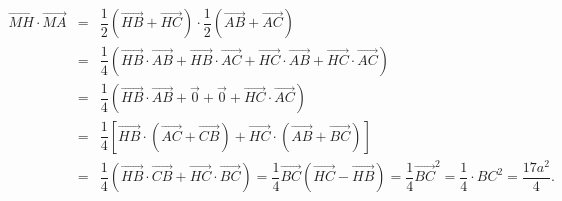 \begin{bt}
{{\begin{tikzpicture}[>=stealth,line join=round,line cap=round,line width=0.6pt,font=\footnotesize,scale=1]
     \end{tikzpicture}
 }
 \begin{eqnarray*}
    \overrightarrow{MH}\cdot\overrightarrow{MA}&=&\dfrac{1}{2} \left(\overrightarrow{HB}+\overrightarrow{HC}\right)\cdot \dfrac{1}{2} \left(\overrightarrow{AB}+\overrightarrow{AC}\right)\\
    &=&\dfrac{1}{4}\left(\overrightarrow{HB}\cdot \overrightarrow{AB}+\overrightarrow{HB}\cdot \overrightarrow{AC}+\overrightarrow{HC}\cdot \overrightarrow{AB}+\overrightarrow{HC}\cdot \overrightarrow{AC}\right)\\
    &=& \dfrac{1}{4}\left(\overrightarrow{HB}\cdot \overrightarrow{AB}+\overrightarrow{0}+\overrightarrow{0}+\overrightarrow{HC}\cdot \overrightarrow{AC}\right)\\
    &=&\dfrac{1}{4}\left[\overrightarrow{HB}\cdot\left(\overrightarrow{AC}+\overrightarrow{CB}\right)+\overrightarrow{HC}\cdot\left(\overrightarrow{AB}+\overrightarrow{BC}\right)\right]\\
    &=&\dfrac{1}{4}\left(\overrightarrow{HB}\cdot \overrightarrow{CB}+\overrightarrow{HC}\cdot \overrightarrow{BC}\right)=\dfrac{1}{4}\overrightarrow{BC}\left(\overrightarrow{HC}-\overrightarrow{HB}\right)=\dfrac{1}{4}\overrightarrow{BC}^2=\dfrac{1}{4}\cdot BC^2=\dfrac{17a^2}{4}.
\end{eqnarray*}
}
\end{bt}

